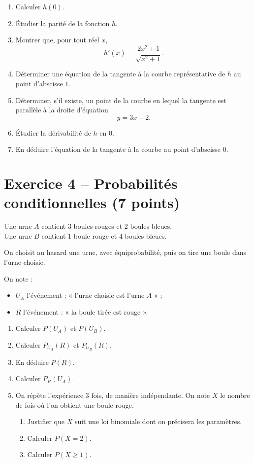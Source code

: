 \documentclass[11pt,a4paper]{article}
\begin{document}
\begin{enumerate}[label=\textbf{\arabic*.}, leftmargin=1.1cm]
    \item Calculer \( h(0) \).
    \item Étudier la parité de la fonction \( h \).
    \item Montrer que, pour tout réel \( x \),
    \[
    h'(x)=\frac{2x^2+1}{\sqrt{x^2+1}}.
    \]
    \item Déterminer une équation de la tangente à la courbe représentative de \( h \) au point d'abscisse \( 1 \).
    \item Déterminer, s'il existe, un point de la courbe en lequel la tangente est parallèle à la droite d'équation
    \[
    y=3x-2.
    \]
    \item Étudier la dérivabilité de \( h \) en \( 0 \).
    \item En déduire l'équation de la tangente à la courbe au point d'abscisse \( 0 \).
\end{enumerate}

\vspace{0.5em}

\section*{Exercice 4 -- Probabilités conditionnelles \hfill \textnormal{(7 points)}}

Une urne \( A \) contient 3 boules rouges et 2 boules bleues.\\
Une urne \( B \) contient 1 boule rouge et 4 boules bleues.

On choisit au hasard une urne, avec équiprobabilité, puis on tire une boule dans l'urne choisie.

On note :
\begin{itemize}[leftmargin=1.2cm]
    \item \( U_A \) l'événement : « l'urne choisie est l'urne \( A \) » ;
    \item \( R \) l'événement : « la boule tirée est rouge ».
\end{itemize}

\begin{enumerate}[label=\textbf{\arabic*.}, leftmargin=1.1cm]
    \item Calculer \( P(U_A) \) et \( P(U_B) \).
    \item Calculer \( P_{U_A}(R) \) et \( P_{U_B}(R) \).
    \item En déduire \( P(R) \).
    \item Calculer \( P_R(U_A) \).
    \item On répète l'expérience 3 fois, de manière indépendante. On note \( X \) le nombre de fois où l'on obtient une boule rouge.
    \begin{enumerate}[label=\textbf{\alph*)}, leftmargin=0.9cm]
        \item Justifier que \( X \) suit une loi binomiale dont on précisera les paramètres.
        \item Calculer \( P(X=2) \).
        \item Calculer \( P(X\ge 1) \).
    \end{enumerate}
\end{enumerate}
\end{document}
